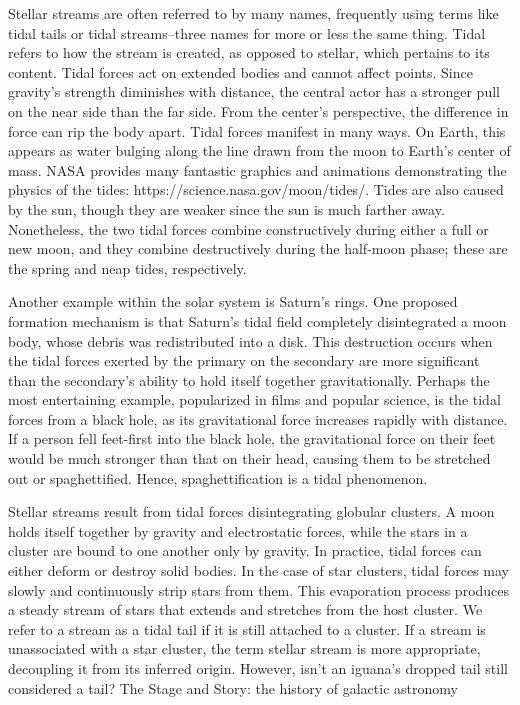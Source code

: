 Stellar streams are often referred to by many names, frequently using terms like tidal tails or tidal streams–three names for more or less the same thing. Tidal refers to how the stream is created, as opposed to stellar, which pertains to its content. Tidal forces act on extended bodies and cannot affect points. Since gravity's strength diminishes with distance, the central actor has a stronger pull on the near side than the far side. From the center's perspective, the difference in force can rip the body apart. Tidal forces manifest in many ways. On Earth, this appears as water bulging along the line drawn from the moon to Earth's center of mass. NASA provides many fantastic graphics and animations demonstrating the physics of the tides: https://science.nasa.gov/moon/tides/. Tides are also caused by the sun, though they are weaker since the sun is much farther away. Nonetheless, the two tidal forces combine constructively during either a full or new moon, and they combine destructively during the half-moon phase; these are the spring and neap tides, respectively.

Another example within the solar system is Saturn's rings. One proposed formation mechanism is that Saturn's tidal field completely disintegrated a moon body, whose debris was redistributed into a disk. This destruction occurs when the tidal forces exerted by the primary on the secondary are more significant than the secondary's ability to hold itself together gravitationally. Perhaps the most entertaining example, popularized in films and popular science, is the tidal forces from a black hole, as its gravitational force increases rapidly with distance. If a person fell feet-first into the black hole, the gravitational force on their feet would be much stronger than that on their head, causing them to be stretched out or spaghettified. Hence, spaghettification is a tidal phenomenon. 

Stellar streams result from tidal forces disintegrating globular clusters. A moon holds itself together by gravity and electrostatic forces, while the stars in a cluster are bound to one another only by gravity. In practice, tidal forces can either deform or destroy solid bodies. In the case of star clusters, tidal forces may slowly and continuously strip stars from them. This evaporation process produces a steady stream of stars that extends and stretches from the host cluster. We refer to a stream as a tidal tail if it is still attached to a cluster. If a stream is unassociated with a star cluster, the term stellar stream is more appropriate, decoupling it from its inferred origin. However, isn't an iguana's dropped tail still considered a tail?
The Stage and Story: the history of galactic astronomy 

